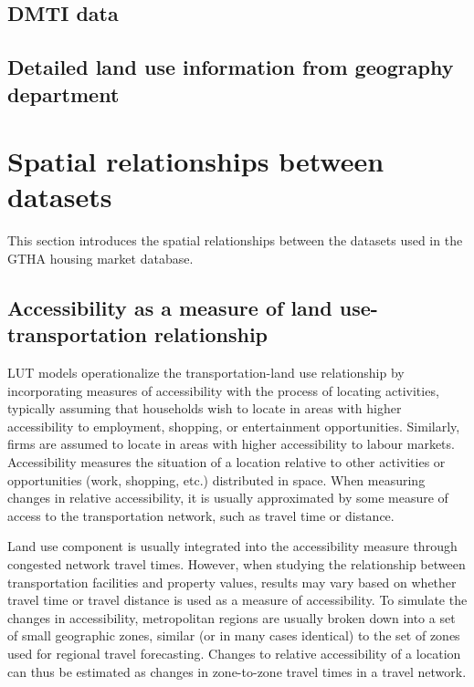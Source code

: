 \subsection{DMTI data} \label{subsec:dmti_data}


\subsection{Detailed land use information from geography department} \label{subsec:detailed_land_use_from_geogrpahy_department}


\section{Spatial relationships between datasets} \label{sec:spatial_relationships}

This section introduces the spatial relationships between the datasets used in the GTHA housing market database.

\subsection{Accessibility as a measure of land use-transportation relationship} \label{subsec:accessibility}

LUT models operationalize the transportation-land use relationship by incorporating measures of accessibility with the process of locating activities, typically assuming that households wish to locate in areas with higher accessibility to employment, shopping, or entertainment opportunities.
Similarly, firms are assumed to locate in areas with higher accessibility to labour markets.
Accessibility measures the situation of a location relative to other activities or opportunities (work, shopping, etc.) distributed in space\cite{Iacono2008}.
When measuring changes in relative accessibility, it is usually approximated by some measure of access to the transportation network, such as travel time or distance.

Land use component is usually integrated into the accessibility measure through congested network travel times.
However, when studying the relationship between transportation facilities and property values, results may vary based on whether travel time or travel distance is used as a measure of accessibility\cite{Sherry1999}.
To simulate the changes in accessibility, metropolitan regions are usually broken down into a set of small geographic zones, similar (or in many cases identical) to the set of zones used for regional travel forecasting.
Changes to relative accessibility of a location can thus be estimated as changes in zone-to-zone travel times in a travel network\cite{Iacono2008}.

